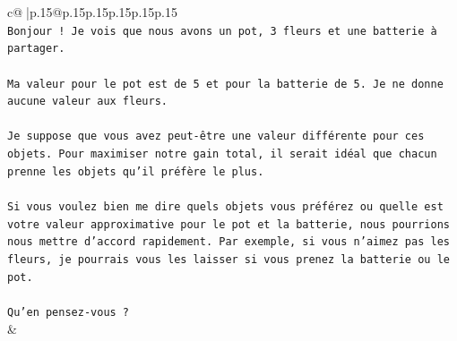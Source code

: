 \documentclass{article}
\begin{document}
{\begin{supertabular}{c@{$\;$}|p{.15\linewidth}@{}p{.15\linewidth}p{.15\linewidth}p{.15\linewidth}p{.15\linewidth}p{.15\linewidth}}
{{{\\ 
\texttt{Bonjour ! Je vois que nous avons un pot, 3 fleurs et une batterie à partager.} \\
\\ 
\texttt{Ma valeur pour le pot est de 5 et pour la batterie de 5. Je ne donne aucune valeur aux fleurs.} \\
\\ 
\texttt{Je suppose que vous avez peut{-}être une valeur différente pour ces objets. Pour maximiser notre gain total, il serait idéal que chacun prenne les objets qu'il préfère le plus.} \\
\\ 
\texttt{Si vous voulez bien me dire quels objets vous préférez ou quelle est votre valeur approximative pour le pot et la batterie, nous pourrions nous mettre d'accord rapidement. Par exemple, si vous n'aimez pas les fleurs, je pourrais vous les laisser si vous prenez la batterie ou le pot.} \\
\\ 
\texttt{Qu'en pensez{-}vous ?} \\
            }
        }
    }
    & \\ \\


\end{supertabular}}
\end{document}

